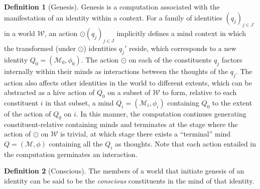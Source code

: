 \documentclass[pra,twocolumn,groupedaddress,10pt]{revtex4}
\theoremstyle{definition}
\newtheorem{defn}{Definition}[section]
\begin{document}
\begin{defn}[Genesis]
	Genesis is a computation associated with the manifestation of an identity within a context. For a family of identities $(q_{j})_{j \in J}$ in a world $\mathcal{W}$, an action $\odot (q_{j})_{j \in J}$ implicitly defines a mind context in which the transformed (under $\odot$) identities $q_{j}'$ reside, which corresponds to a new identity $Q_{0} = (\mathcal{M}_{0}, \phi_{0})$. The action $\odot$ on each of the constituents $q_{j}$ factors internally within their minds as interactions between the thoughts of the $q_{j}$. The action also affects other identities in the world to different extents, which can be abstracted as a hive action of $Q_{0}$ on a subset of $\mathcal{W}$ to form, relative to each constituent $i$ in that subset, a mind $Q_{i} = (\mathcal{M}_{i}, \phi_{i})$ containing $Q_{0}$ to the extent of the action of $Q_{0}$ on $i$. In this manner, the computation continues generating constituent-relative containing minds and terminates at the stage where the action of $\odot$ on $\mathcal{W}$ is trivial, at which stage there exists a ``terminal'' mind $Q = (\mathcal{M}, \phi)$ containing all the $Q_{i}$ as thoughts. Note that each action entailed in the computation germinates an interaction.
\end{defn}

\begin{defn}[Conscious]
	The members of a world that initiate genesis of an identity can be said to be the \emph{conscious} constituents in the mind of that identity.
\end{defn}
\end{document}

